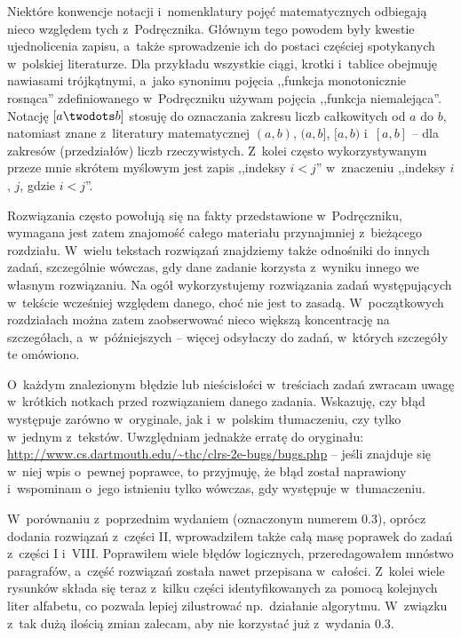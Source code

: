 Niektóre konwencje notacji i~nomenklatury pojęć matematycznych odbiegają nieco względem tych z~Podręcznika.
Głównym tego powodem były kwestie ujednolicenia zapisu, a~także sprowadzenie ich do postaci częściej spotykanych w~polskiej literaturze.
Dla przykładu wszystkie ciągi, krotki i~tablice obejmuję nawiasami trójkątnymi, a~jako synonimu pojęcia ,,funkcja monotonicznie rosnąca'' zdefiniowanego w~Podręczniku używam pojęcia ,,funkcja niemalejąca''.
Notację $[a\twodots b]$ stosuję do oznaczania zakresu liczb całkowitych od $a$ do $b$, natomiast znane z~literatury matematycznej $(a,b)$, $(a,b]$, $[a,b)$ i~$[a,b]$ -- dla zakresów (przedziałów) liczb rzeczywistych.
Z~kolei często wykorzystywanym przeze mnie skrótem myślowym jest zapis ,,indeksy $i<j$'' w~znaczeniu ,,indeksy $i$, $j$, gdzie $i<j$''.

Rozwiązania często powołują się na fakty przedstawione w~Podręczniku, wymagana jest zatem znajomość całego materiału przynajmniej z~bieżącego rozdziału.
W~wielu tekstach rozwiązań znajdziemy także odnośniki do innych zadań, szczególnie wówczas, gdy dane zadanie korzysta z~wyniku innego we własnym rozwiązaniu.
Na ogół wykorzystujemy rozwiązania zadań występujących w~tekście wcześniej względem danego, choć nie jest to zasadą.
W~początkowych rozdziałach można zatem zaobserwować nieco większą koncentrację na szczegółach, a~w~późniejszych -- więcej odsyłaczy do zadań, w~których szczegóły te omówiono.

O~każdym znalezionym błędzie lub nieścisłości w~treściach zadań zwracam uwagę w~krótkich notkach przed rozwiązaniem danego zadania.
Wskazuję, czy błąd występuje zarówno w~oryginale, jak i~w~polskim tłumaczeniu, czy tylko w~jednym z~tekstów.
Uwzględniam jednakże erratę do oryginału: \url{http://www.cs.dartmouth.edu/~thc/clrs-2e-bugs/bugs.php} -- jeśli znajduje się w~niej wpis o~pewnej poprawce, to przyjmuję, że błąd został naprawiony i~wspominam o~jego istnieniu tylko wówczas, gdy występuje w~tłumaczeniu.

W~porównaniu z~poprzednim wydaniem (oznaczonym numerem 0.3), oprócz dodania rozwiązań z~części II, wprowadziłem także całą masę poprawek do zadań z~części I i~VIII.
Poprawiłem wiele błędów logicznych, przeredagowałem mnóstwo paragrafów, a~część rozwiązań została nawet przepisana w~całości.
Z~kolei wiele rysunków składa się teraz z~kilku części identyfikowanych za pomocą kolejnych liter alfabetu, co pozwala lepiej zilustrować np.\ działanie algorytmu.
W~związku z~tak dużą ilością zmian zalecam, aby nie korzystać już z~wydania 0.3.

